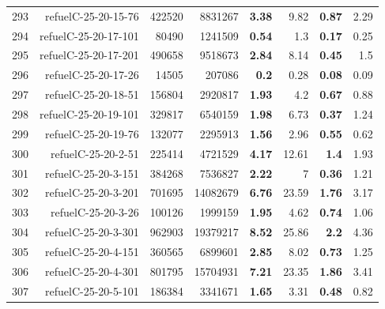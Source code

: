\begin{longtable}{lrr@{\hskip 12pt}r@{\hskip 12pt}r@{\hskip 12pt}r@{\hskip 12pt}r@{\hskip 12pt}r}
293 & \multirow{1}{*}{refuelC-25-20-15-76} & \multirow{1}{*}{422520} & \multirow{1}{*}{8831267} & \textbf{3.38} & 9.82 & \textbf{0.87} & 2.29 \\
294 & \multirow{1}{*}{refuelC-25-20-17-101} & \multirow{1}{*}{80490} & \multirow{1}{*}{1241509} & \textbf{0.54} & 1.3 & \textbf{0.17} & 0.25 \\
295 & \multirow{1}{*}{refuelC-25-20-17-201} & \multirow{1}{*}{490658} & \multirow{1}{*}{9518673} & \textbf{2.84} & 8.14 & \textbf{0.45} & 1.5 \\
296 & \multirow{1}{*}{refuelC-25-20-17-26} & \multirow{1}{*}{14505} & \multirow{1}{*}{207086} & \textbf{0.2} & 0.28 & \textbf{0.08} & 0.09 \\
297 & \multirow{1}{*}{refuelC-25-20-18-51} & \multirow{1}{*}{156804} & \multirow{1}{*}{2920817} & \textbf{1.93} & 4.2 & \textbf{0.67} & 0.88 \\
298 & \multirow{1}{*}{refuelC-25-20-19-101} & \multirow{1}{*}{329817} & \multirow{1}{*}{6540159} & \textbf{1.98} & 6.73 & \textbf{0.37} & 1.24 \\
299 & \multirow{1}{*}{refuelC-25-20-19-76} & \multirow{1}{*}{132077} & \multirow{1}{*}{2295913} & \textbf{1.56} & 2.96 & \textbf{0.55} & 0.62 \\
300 & \multirow{1}{*}{refuelC-25-20-2-51} & \multirow{1}{*}{225414} & \multirow{1}{*}{4721529} & \textbf{4.17} & 12.61 & \textbf{1.4} & 1.93 \\
301 & \multirow{1}{*}{refuelC-25-20-3-151} & \multirow{1}{*}{384268} & \multirow{1}{*}{7536827} & \textbf{2.22} & 7 & \textbf{0.36} & 1.21 \\
302 & \multirow{1}{*}{refuelC-25-20-3-201} & \multirow{1}{*}{701695} & \multirow{1}{*}{14082679} & \textbf{6.76} & 23.59 & \textbf{1.76} & 3.17 \\
303 & \multirow{1}{*}{refuelC-25-20-3-26} & \multirow{1}{*}{100126} & \multirow{1}{*}{1999159} & \textbf{1.95} & 4.62 & \textbf{0.74} & 1.06 \\
304 & \multirow{1}{*}{refuelC-25-20-3-301} & \multirow{1}{*}{962903} & \multirow{1}{*}{19379217} & \textbf{8.52} & 25.86 & \textbf{2.2} & 4.36 \\
305 & \multirow{1}{*}{refuelC-25-20-4-151} & \multirow{1}{*}{360565} & \multirow{1}{*}{6899601} & \textbf{2.85} & 8.02 & \textbf{0.73} & 1.25 \\
306 & \multirow{1}{*}{refuelC-25-20-4-301} & \multirow{1}{*}{801795} & \multirow{1}{*}{15704931} & \textbf{7.21} & 23.35 & \textbf{1.86} & 3.41 \\
307 & \multirow{1}{*}{refuelC-25-20-5-101} & \multirow{1}{*}{186384} & \multirow{1}{*}{3341671} & \textbf{1.65} & 3.31 & \textbf{0.48} & 0.82 \\

\end{longtable}
